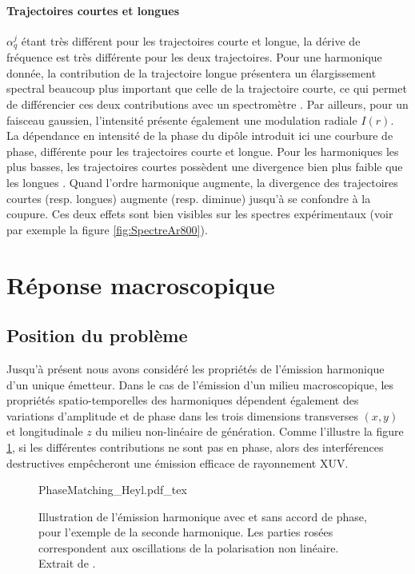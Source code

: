 \paragraph{Trajectoires courtes et longues} $\alpha_q^j$ étant très différent pour les trajectoires courte et longue, la dérive de fréquence est très différente pour les deux trajectoires. Pour une harmonique donnée, la contribution de la trajectoire longue présentera un élargissement spectral beaucoup plus important que celle de la trajectoire courte, ce qui permet de différencier ces deux contributions avec un spectromètre . Par ailleurs, pour un faisceau gaussien, l'intensité présente également une modulation radiale $I(r)$. La dépendance en intensité de la phase du dipôle introduit ici une courbure de phase, différente pour les trajectoires courte et longue. Pour les harmoniques les plus basses, les trajectoires courtes possèdent une divergence bien plus faible que les longues . Quand l'ordre harmonique augmente, la divergence des trajectoires courtes (resp. longues) augmente (resp. diminue) jusqu'à se confondre à la coupure. Ces deux effets sont bien visibles sur les spectres expérimentaux (voir par exemple la figure \ref{fig:SpectreAr800}).

\section{Réponse macroscopique}
\label{sec:AccordDePhase}
\subsection{Position du problème}
Jusqu'à présent nous avons considéré les propriétés de l'émission harmonique d'un unique émetteur. Dans le cas de l'émission d'un milieu macroscopique, les propriétés spatio-temporelles des harmoniques dépendent également des variations d'amplitude et de phase dans les trois dimensions transverses $(x,y)$ et longitudinale $z$ du milieu non-linéaire de génération. Comme l'illustre la figure \ref{fig:PhaseMatchingHeyl}, si les différentes contributions ne sont pas en phase, alors des interférences destructives empêcheront une émission efficace de rayonnement XUV.

\begin{figure}[ht]
\centering
\def\svgwidth{0.7\columnwidth}
{PhaseMatching_Heyl.pdf_tex}
\caption{Illustration de l'émission harmonique avec et sans accord de phase, pour l'exemple de la seconde harmonique. Les parties rosées correspondent aux oscillations de la polarisation non linéaire. Extrait de .}
\label{fig:PhaseMatchingHeyl}
\end{figure}

